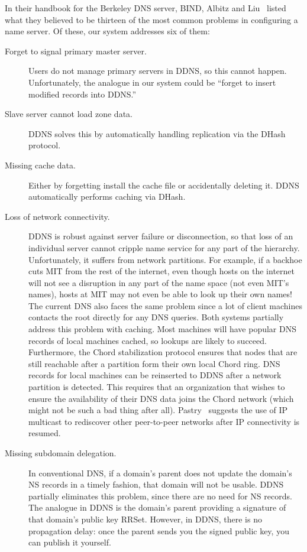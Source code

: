 In their handbook for the Berkeley DNS server, BIND,
Albitz and Liu~\cite{dns-bind} listed what they believed to be
thirteen of the most common problems in configuring
a name server.
Of these, our system addresses six of them:
\begin{description}
\item[Forget to signal primary master server.]
Users do not manage primary servers in DDNS, so this cannot happen.
Unfortunately, the analogue in our system could be ``forget to
insert modified records into DDNS.''

\item[Slave server cannot load zone data.]
DDNS solves this by automatically handling replication 
via the DHash protocol.

\item[Missing cache data.] Either by forgetting install the 
cache file or accidentally deleting it. DDNS automatically 
performs caching via DHash.

\item[Loss of network connectivity.]
DDNS is robust against server failure or disconnection, so that loss of
an individual server cannot cripple name service for any part of the
hierarchy. Unfortunately, it suffers from 
network partitions. For example, if a backhoe cuts MIT from 
the rest of the internet,
even though hosts on the internet will not see a disruption in any
part of the name space (not even MIT's names), hosts at MIT
may not even be able to look up their own names! 
The current DNS also faces the same problem since a lot
of client machines contacts the root directly for any DNS queries.
Both systems partially address this problem with caching.
Most machines will have popular DNS records of local machines
cached, so lookups are likely to succeed.
Furthermore, the Chord stabilization protocol ensures that nodes that 
are still reachable after a partition form their own local 
Chord ring. DNS records for local machines can be reinserted to
DDNS after a network partition is detected. 
This requires that 
an organization that wishes to ensure the availability of their
DNS data joins the Chord network (which might not be such a bad thing after all).
Pastry~\cite{pastry01} suggests the use of IP multicast to rediscover
other peer-to-peer networks after IP connectivity is resumed.

\item[Missing subdomain delegation.]
In conventional DNS, if a domain's parent does not
update the domain's NS records in a timely fashion,
that domain will not be usable.  
DDNS partially eliminates this problem, since there are 
no need for NS records.
The analogue in DDNS is the domain's parent providing a signature
of that domain's public key RRSet.
However, in DDNS, there is no propagation delay: once the
parent sends you the signed public key, you can publish it yourself.


\end{description}
